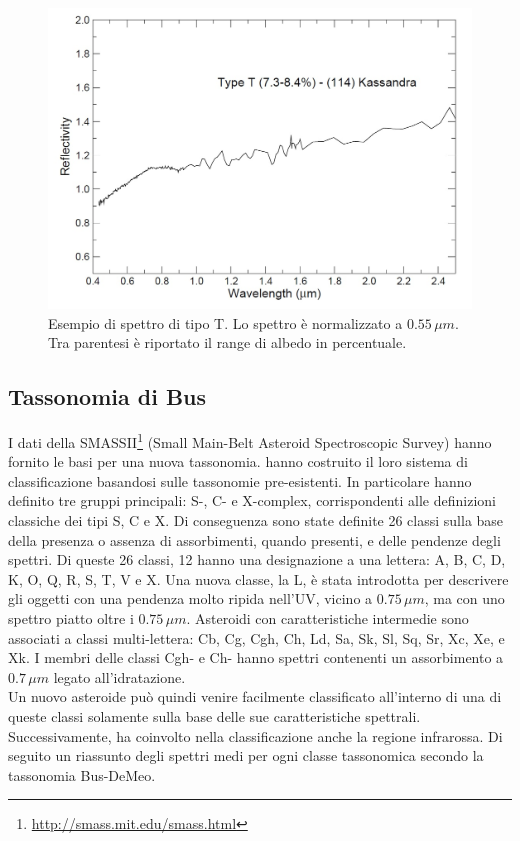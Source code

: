 \begin{figure}[!h]
    \centering
    \includegraphics[scale=0.3]{figure/spettro_t.jpg}
    \caption[Esempio di spettro di tipo T.]{Esempio di spettro di tipo T. Lo spettro è normalizzato a $0.55\,\mu m$. Tra parentesi è riportato il range di albedo in percentuale. \citep{magrin_spectroscopic_nodate}}
    \label{spettro_t}
\end{figure}

\subsection{Tassonomia di Bus}
I dati della SMASSII\footnote{\href{http://smass.mit.edu/smass.html}{http://smass.mit.edu/smass.html}} (Small Main-Belt Asteroid Spectroscopic Survey) hanno fornito le basi per una nuova tassonomia. \citet{bus_phase_2002, bus_phase_2002-1} hanno costruito il loro sistema di classificazione basandosi sulle tassonomie pre-esistenti. In particolare hanno definito tre gruppi principali: S-, C- e X-complex, corrispondenti alle definizioni classiche dei tipi S, C e X. Di conseguenza sono state definite 26 classi sulla base della presenza o assenza di assorbimenti, quando presenti, e delle pendenze degli spettri. Di queste 26 classi, 12 hanno una designazione a una lettera: A, B, C, D, K, O, Q, R, S, T, V e X. Una nuova classe, la L, è stata introdotta per descrivere gli oggetti con una pendenza molto ripida nell'UV, vicino a $0.75\,\mu m$, ma con uno spettro piatto oltre i $0.75\,\mu m$. Asteroidi con caratteristiche intermedie sono associati a classi multi-lettera: Cb, Cg, Cgh, Ch, Ld, Sa, Sk, Sl, Sq, Sr, Xc, Xe, e Xk. I membri delle classi Cgh- e Ch- hanno spettri contenenti un assorbimento a $0.7\,\mu m$ legato all'idratazione.\\
Un nuovo asteroide può quindi venire facilmente classificato all’interno di una di queste classi solamente sulla base delle sue caratteristiche spettrali. Successivamente, \citet{demeo_extension_2009} ha coinvolto nella classificazione anche la regione infrarossa. Di seguito un riassunto degli spettri medi per ogni classe tassonomica secondo la tassonomia Bus-DeMeo.

